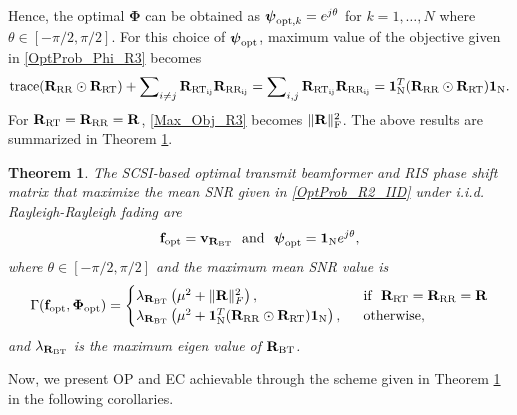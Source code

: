 \documentclass[journal,draftclsnofoot,onecolumn,12pt]{IEEEtran}
\newtheorem{theorem}{Theorem}
\begin{document}
Hence, the optimal $\mathbf{\Phi}$ can be obtained as $\boldsymbol{\psi}_{{\rm opt},k} = e^{j{\theta}}$ for $k=1,\dots,N$ where $\theta\in[-\pi/2 , \pi/2]$. For this choice of $\boldsymbol{\psi}_{\rm opt}$, maximum value of the objective given in \eqref{OptProb_Phi_R3} becomes
\begin{equation}
    {\rm trace}(\mathbf{R}_{\rm RR}\odot\mathbf{R}_{\rm RT}) + \sum\nolimits_{i\neq j}\mathbf{R}_{\rm RT_{ij}}\mathbf{R}_{\rm RR_{ij}} = \sum\nolimits_{i,j} \mathbf{R}_{\rm RT_{ij}}\mathbf{R}_{\rm RR_{ij}}=\mathbf{1}_{\rm N}^T(\mathbf{R}_{\rm RR}\odot\mathbf{R}_{\rm RT})\mathbf{1}_{\rm N}.\label{Max_Obj_R3}
\end{equation}
For $\mathbf{R}_{\rm RT} = \mathbf{R}_{\rm RR}=\mathbf{R}$, \eqref{Max_Obj_R3} becomes $\|\mathbf{R}\|_{\rm F}^2$. The above results are summarized in  Theorem \ref{Theo5}.
\vspace{-0.3cm}
\begin{theorem}\label{Theo5}
    The SCSI-based optimal transmit beamformer and RIS phase shift matrix that maximize the mean SNR given in \eqref{OptProb_R2_IID} under {\rm i.i.d.} Rayleigh-Rayleigh fading are
   \begin{align}
    \mathbf{f}_{\rm opt} = \mathbf{v_{R_{\rm BT}}}
    \text{~~and~~}\boldsymbol{\psi}_{\rm opt} = \mathbf{1}_{\rm N} e^{j{\theta}},\label{OptSol_R3}
    \end{align}
    \vspace{-0.3cm}
    where $\theta\in[-\pi/2 , \pi/2]$ and the maximum mean {\rm SNR} value is
    \begin{equation}
        \Gamma(\mathbf{f}_{\rm opt},\mathbf{\Phi}_{\rm opt})=\begin{cases}
            \lambda_{\mathbf{R}_{\rm BT}}\left(\mu^2 + \|\mathbf{R}\|_F^2\right), ~~&\text{if~ }\mathbf{R}_{\rm RT} = \mathbf{R}_{\rm RR}=\mathbf{R}\\
             \lambda_{\mathbf{R}_{\rm BT}}\left(\mu^2 +\mathbf{1}_{\rm N}^T(\mathbf{R}_{\rm RR}\odot\mathbf{R}_{\rm RT})\mathbf{1}_{\rm N}\right), ~~&\text{otherwise},
        \end{cases}\label{eq:R3cor_maxSNR}
    \end{equation}
    and $\lambda_{\mathbf{R}_{\rm BT}}$ is the maximum eigen value of $\mathbf{R}_{\rm BT}$.
\end{theorem}
Now, we present OP and EC achievable through the scheme given in Theorem \ref{Theo5} in the following corollaries.
\end{document}
